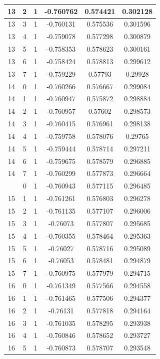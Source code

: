 \documentclass[12pt,a4paper]{article}
\numberwithin{equation}{section}
\numberwithin{figure}{section}
\numberwithin{table}{section}
\begin{document}
\begin{longtable}{|c|c|c|c|c|c|}
13 & 2 & 1 & -0.760762 & 0.574421 & 0.302128 \\ \hline
13 & 3 & 1 & -0.760131 & 0.575536 & 0.301596 \\ \hline
13 & 4 & 1 & -0.759078 & 0.577298 & 0.300879 \\ \hline
13 & 5 & 1 & -0.758353 & 0.578623 & 0.300161 \\ \hline
13 & 6 & 1 & -0.758424 & 0.578813 & 0.299612 \\ \hline
13 & 7 & 1 & -0.759229 & 0.57793 & 0.29928 \\ \hline
14 & 0 & 1 & -0.760266 & 0.576667 & 0.299084 \\ \hline
14 & 1 & 1 & -0.760947 & 0.575872 & 0.298884 \\ \hline
14 & 2 & 1 & -0.760957 & 0.57602 & 0.298573 \\ \hline
14 & 3 & 1 & -0.760415 & 0.576961 & 0.298138 \\ \hline
14 & 4 & 1 & -0.759758 & 0.578076 & 0.29765 \\ \hline
14 & 5 & 1 & -0.759444 & 0.578714 & 0.297211 \\ \hline
14 & 6 & 1 & -0.759675 & 0.578579 & 0.296885 \\ \hline
14 & 7 & 1 & -0.760299 & 0.577873 & 0.296664 \\ \hline
\pagebreak
15 & 0 & 1 & -0.760943 & 0.577115 & 0.296485 \\ \hline
15 & 1 & 1 & -0.761261 & 0.576803 & 0.296278 \\ \hline
15 & 2 & 1 & -0.761135 & 0.577107 & 0.296006 \\ \hline
15 & 3 & 1 & -0.76073 & 0.577807 & 0.295685 \\ \hline
15 & 4 & 1 & -0.760355 & 0.578464 & 0.295363 \\ \hline
15 & 5 & 1 & -0.76027 & 0.578716 & 0.295089 \\ \hline
15 & 6 & 1 & -0.76053 & 0.578481 & 0.294879 \\ \hline
15 & 7 & 1 & -0.760975 & 0.577979 & 0.294715 \\ \hline
16 & 0 & 1 & -0.761349 & 0.577566 & 0.294558 \\ \hline
16 & 1 & 1 & -0.761465 & 0.577506 & 0.294377 \\ \hline
16 & 2 & 1 & -0.76131 & 0.577818 & 0.294164 \\ \hline
16 & 3 & 1 & -0.761035 & 0.578295 & 0.293938 \\ \hline
16 & 4 & 1 & -0.760846 & 0.578652 & 0.293727 \\ \hline
16 & 5 & 1 & -0.760873 & 0.578707 & 0.293548 \\ \hline

\end{longtable}
\end{document}
